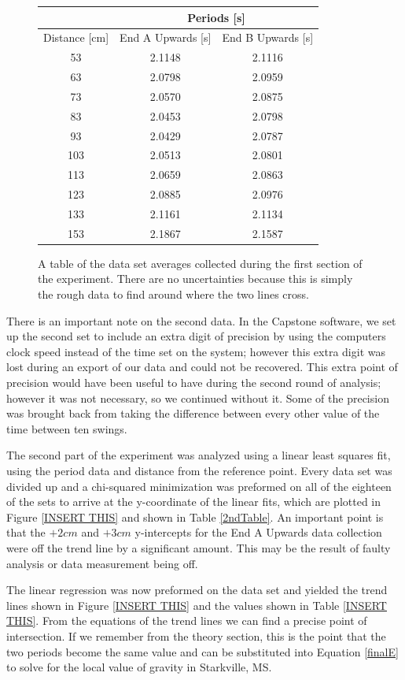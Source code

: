 \documentclass[aps,prl,10pt,twocolumn,floatfix]{revtex4-2}
\begin{document}
\begin{figure}
\begin{tabular}{|c|c|c|}
\hline
& \multicolumn{2}{|c|}{Periods [s]}\\
\hline
Distance [cm] & End A Upwards [s] & End B Upwards [s]\\
\hline
53&	2.1148&	2.1116\\
63&	2.0798&	2.0959\\
73&	2.0570&	2.0875\\
83&	2.0453&	2.0798\\
93&	2.0429&	2.0787\\
103&	2.0513&	2.0801\\
113&	2.0659&	2.0863\\
123&	2.0885&	2.0976\\
133&	2.1161&	2.1134\\
153&	2.1867&	2.1587\\
\hline
\end{tabular}
\caption{A table of the data set averages collected during the first section of the experiment. There are no uncertainties because this is simply the rough data to find around where the two lines cross.}
\label{1stTable}
\end{figure}

There is an important note on the second data. 
In the Capstone software, we set up the second set to include an extra digit of precision by using the computers clock speed instead of the time set on the system;
however this extra digit was lost during an export of our data and could not be recovered.
This extra point of precision would have been useful to have during the second round of analysis;
however it was not necessary, so we continued without it.
Some of the precision was brought back from taking the difference between every other value of the time between ten swings.

The second part of the experiment was analyzed using a linear least squares fit, using the period data and distance from the reference point. 
Every data set was divided up and a chi-squared minimization was preformed on all of the eighteen of the sets to arrive at the y-coordinate of the linear fits, which are plotted in Figure \ref{INSERT THIS} and shown in Table \ref{2ndTable}.
An important point is that the $+2cm$ and $+3cm$ y-intercepts for the End A Upwards data collection were off the trend line by a significant amount.
This may be the result of faulty analysis or data measurement being off. 

The linear regression was now preformed on the data set and yielded the trend lines shown in Figure \ref{INSERT THIS} and the values shown in Table \ref{INSERT THIS}.
From the equations of the trend lines we can find a precise point of intersection.
If we remember from the theory section, this is the point that the two periods become the same value and can be substituted into Equation \ref{finalE} to solve for the local value of gravity in Starkville, MS. 
\end{document}
